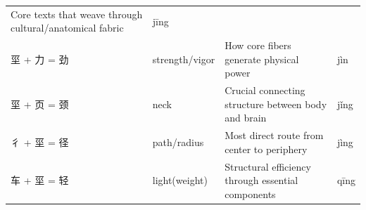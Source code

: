 \begin{longtable}[]{@{}llll@{}}
\begin{minipage}[t]{0.43\columnwidth}
Core texts that weave through cultural/anatomical fabric\strut
\end{minipage} & \begin{minipage}[t]{0.15\columnwidth}\raggedright
jīng\strut
\end{minipage}\tabularnewline
\begin{minipage}[t]{0.15\columnwidth}\raggedright
坙 + 力 = 劲\strut
\end{minipage} & \begin{minipage}[t]{0.15\columnwidth}\raggedright
strength/vigor\strut
\end{minipage} & \begin{minipage}[t]{0.43\columnwidth}\raggedright
How core fibers generate physical power\strut
\end{minipage} & \begin{minipage}[t]{0.15\columnwidth}\raggedright
jìn\strut
\end{minipage}\tabularnewline
\begin{minipage}[t]{0.15\columnwidth}\raggedright
坙 + 页 = 颈\strut
\end{minipage} & \begin{minipage}[t]{0.15\columnwidth}\raggedright
neck\strut
\end{minipage} & \begin{minipage}[t]{0.43\columnwidth}\raggedright
Crucial connecting structure between body and brain\strut
\end{minipage} & \begin{minipage}[t]{0.15\columnwidth}\raggedright
jǐng\strut
\end{minipage}\tabularnewline
\begin{minipage}[t]{0.15\columnwidth}\raggedright
彳 + 坙 = 径\strut
\end{minipage} & \begin{minipage}[t]{0.15\columnwidth}\raggedright
path/radius\strut
\end{minipage} & \begin{minipage}[t]{0.43\columnwidth}\raggedright
Most direct route from center to periphery\strut
\end{minipage} & \begin{minipage}[t]{0.15\columnwidth}\raggedright
jìng\strut
\end{minipage}\tabularnewline
\begin{minipage}[t]{0.15\columnwidth}\raggedright
车 + 坙 = 轻\strut
\end{minipage} & \begin{minipage}[t]{0.15\columnwidth}\raggedright
light(weight)\strut
\end{minipage} & \begin{minipage}[t]{0.43\columnwidth}\raggedright
Structural efficiency through essential components\strut
\end{minipage} & \begin{minipage}[t]{0.15\columnwidth}\raggedright
qīng\strut
\end{minipage}\tabularnewline
\bottomrule
\end{longtable}

